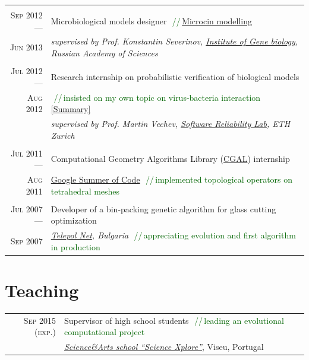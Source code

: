 \documentclass[a4paper,10pt]{article}
\def\myline{\color{linegray}\vline}
\newcommand{\minorcolor}[1]{\textcolor{mygray}{#1}}
\newcommand{\comment}[1]{\small\textcolor{darkgreen}{\,\,//\,#1}}
\newcommand{\mydate}[1]{\minorcolor{\textsc{#1}}}
\begin{document}
{\begin{tabular}{r!{\myline}p{14cm}}
        \\
        \mydate{Sep 2012 ---}       &   Microbiological models designer
                                        \comment{\href{https://docs.google.com/document/d/1tNkXLaWY3ooA4MEnrbrL2_DOpOaiTlLoFblwzKFZdy0/edit?usp=sharing}{Microcin modelling}}\\
        \mydate{Jun 2013}           &   \textit{supervised by Prof. Konstantin Severinov, \href{http://www.genebiology.ru/}{Institute of Gene biology}, Russian Academy of Sciences}\\

        \\
        \mydate{Jul 2012 ---}       &   Research internship on probabilistic verification of biological models\\
        \mydate{Aug 2012}           &   \comment{insisted on my own topic on virus-bacteria interaction \href{https://docs.google.com/document/d/1tNkXLaWY3ooA4MEnrbrL2_DOpOaiTlLoFblwzKFZdy0/edit?usp=sharing}{[Summary]}}\\
                                    &   \textit{supervised by Prof. Martin Vechev, \href{http://www.srl.inf.ethz.ch/}{Software Reliability Lab}, ETH Zurich}\\

        \\
        \mydate{Jul 2011 ---}       &   Computational Geometry Algorithms Library (\href{http://www.cgal.org/}{CGAL}) internship\\
        \mydate{Aug 2011}           &   \href{http://code.google.com/soc/}{Google Summer of Code}
                                        \comment{implemented topological operators on tetrahedral meshes}\\

        \\
        \mydate{Jul 2007 ---}       &   Developer of a bin-packing genetic algorithm for glass cutting optimization\\
        \mydate{Sep 2007}           &   \textit{\href{http://telepol.net/telepol.net/}{Telepol Net}, Bulgaria}
                                        \comment{appreciating evolution and first algorithm in production}\\
\end{tabular}


\section{Teaching}
\hspace{0mm}\begin{tabular}{r!{\myline}p{14cm}}
        \mydate{Sep 2015 (exp.)}    &   Supervisor of high school students
                                        \comment{leading an evolutional computational project}\\
                                    &   \textit{\href{http://www.sciencexplore.org/}{Science\&Arts school ``Science Xplore''}}, Viseu, Portugal\\


\end{tabular}}
\end{document}
